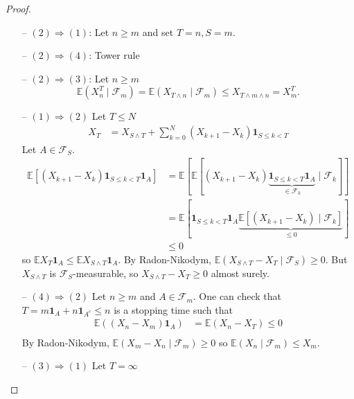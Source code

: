 \documentclass[parskip=full]{article}
\theoremstyle{definition}
\newcommand{\1}{\mathbbm{1}}
\newcommand{\E}{\mathbb{E}}
\begin{document}
\begin{proof}
  \begin{itemize}
    \item[--] $(2) \Rightarrow (1)$: Let $n \geq m$ and set $T = n, S = m$. 
    \item[--] $(2) \Rightarrow (4)$: Tower rule
    \item[--] $(2) \Rightarrow (3)$: Let $n \geq m$
    \[
      \E(X_n^T \mid \mathcal{F}_m) = \E (X_{T \wedge n} \mid \mathcal{F}_m) \leq X_{T \wedge m \wedge n} = X_m^T.
    \]
    \item[--] $(1) \Rightarrow (2)$ Let $T \leq N$
    \begin{align*}
      X_T &=X_{S \wedge T} + \sum_{k = 0}^N (X_{k + 1} - X_k) \mathbf{1}_{S \leq k < T} \tag{$*$}
    \end{align*}
    Let $A \in \mathcal{F}_S$.
    \begin{align*}
      \E \left[(X_{k + 1} - X_k)\mathbf{1}_{S \leq k < T} \mathbf{1}_A \right] &= \E \left[\E \left[(X_{k + 1} - X_k)\underbrace{\mathbf{1}_{S \leq k < T}\mathbf{1}_A}_{\in \mathcal{F}_k} \mid \mathcal{F}_k \right]\right] \\
      &= \E \left[ \mathbf{1}_{S \leq k < T} \mathbf{1}_A \underbrace{\E \left[(X_{k + 1} - X_k) \mid \mathcal{F}_k \right]}_{\leq 0}\right] \\
      &\leq 0
    \end{align*}
    so $\E X_T \mathbf{1}_A \leq \E X_{S \wedge T} \mathbf{1}_A$. By Radon-Nikodym, $\E(X_{S \wedge T} - X_T \mid \mathcal{F}_S) \geq 0$. But $X_{S \wedge T}$ is $\mathcal{F}_S$-measurable, so $X_{S \wedge T} - X_T \geq 0$ almost surely.

    \item[--] $(4) \Rightarrow (2)$ Let $n \geq m$ and $A \in \mathcal{F}_m$. One can check that $T = m \mathbf{1}_A + n \mathbf{1}_{A^c} \leq n$ is a stopping time such that
    \begin{align*}
      \E((X_n - X_m) \mathbf{1}_A) &= \E(X_n - X_T) \leq 0 \\
    \end{align*}
    By Radon-Nikodym, $\E(X_m - X_n \mid \mathcal{F}_m) \geq 0$ so $\E(X_n \mid \mathcal{F}_m) \leq X_m$.

    \item [--] $(3) \Rightarrow (1)$ Let $T = \infty$
  \end{itemize}
\end{proof}
\end{document}
